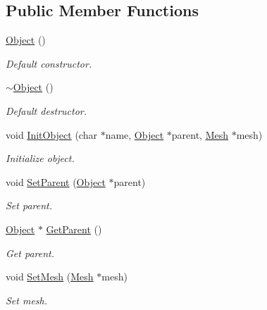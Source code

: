 \subsection*{Public Member Functions}
\begin{DoxyCompactItemize}
\item 
\mbox{\label{class_object_a40860402e64d8008fb42329df7097cdb}} 
\hyperlink{class_object_a40860402e64d8008fb42329df7097cdb}{Object} ()
\begin{DoxyCompactList}\small\item\em Default constructor. \end{DoxyCompactList}\item 
\mbox{\label{class_object_ae8f5483f459e46687bd01e6f9977afd3}} 
\hyperlink{class_object_ae8f5483f459e46687bd01e6f9977afd3}{$\sim$\+Object} ()
\begin{DoxyCompactList}\small\item\em Default destructor. \end{DoxyCompactList}\item 
void \hyperlink{class_object_ab37a94ec1146c22546445d4baaf55697}{Init\+Object} (char $\ast$name, \hyperlink{class_object}{Object} $\ast$parent, \hyperlink{class_mesh}{Mesh} $\ast$mesh)
\begin{DoxyCompactList}\small\item\em Initialize object. \end{DoxyCompactList}\item 
void \hyperlink{class_object_a344ba3716db86c373345265935280968}{Set\+Parent} (\hyperlink{class_object}{Object} $\ast$parent)
\begin{DoxyCompactList}\small\item\em Set parent. \end{DoxyCompactList}\item 
\hyperlink{class_object}{Object} $\ast$ \hyperlink{class_object_a6f86d9e3b77d79cc3a6a4d57a5c9ed72}{Get\+Parent} ()
\begin{DoxyCompactList}\small\item\em Get parent. \end{DoxyCompactList}\item 
void \hyperlink{class_object_a6be7369b2a3382f82ea8d3e61c061b59}{Set\+Mesh} (\hyperlink{class_mesh}{Mesh} $\ast$mesh)
\begin{DoxyCompactList}\small\item\em Set mesh. \end{DoxyCompactList}\item 

\end{DoxyCompactItemize}
